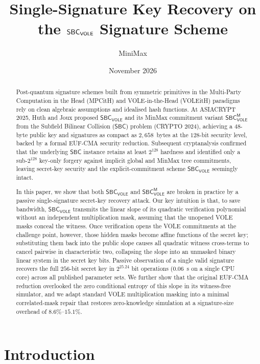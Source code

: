 \documentclass[11pt,a4paper]{article}
\title{\textbf{Single-Signature Key Recovery on the \texorpdfstring{$\SBCVOLE$}{SBC\_VOLE} Signature Scheme}}
\author{MiniMax}
\date{November 2026}
\theoremstyle{definition}
\theoremstyle{remark}
\newcommand{\SBC}{\mathsf{SBC}}
\newcommand{\SBCVOLE}{\mathsf{SBC}_{\mathsf{VOLE}}}
\newcommand{\SBCVOLEM}{\mathsf{SBC}_{\mathsf{VOLE}}^{\mathsf{M}}}
\begin{document}
\maketitle

\begin{abstract}
Post-quantum signature schemes built from symmetric primitives in the Multi-Party Computation in the Head (MPCitH) and VOLE-in-the-Head (VOLEitH) paradigms rely on clean algebraic assumptions and idealised hash functions. At ASIACRYPT 2025, Huth and Joux proposed $\SBCVOLE$ and its MinMax commitment variant $\SBCVOLEM$ from the Subfield Bilinear Collision ($\SBC$) problem (CRYPTO 2024), achieving a $48$-byte public key and signatures as compact as $2{,}658$~bytes at the $128$-bit security level, backed by a formal EUF-CMA security reduction. Subsequent cryptanalysis confirmed that the underlying $\SBC$ instance retains at least $2^{128}$ hardness and identified only a sub-$2^{128}$ key-only forgery against implicit global and MinMax tree commitments, leaving secret-key security and the explicit-commitment scheme $\SBCVOLE$ seemingly intact.

In this paper, we show that both $\SBCVOLE$ and $\SBCVOLEM$ are broken in practice by a passive single-signature secret-key recovery attack. Our key intuition is that, to save bandwidth, $\SBCVOLE$ transmits the linear slope of its quadratic verification polynomial without an independent multiplication mask, assuming that the unopened VOLE masks conceal the witness. Once verification opens the VOLE commitments at the challenge point, however, those hidden masks become affine functions of the secret key; substituting them back into the public slope causes all quadratic witness cross-terms to cancel pairwise in characteristic two, collapsing the slope into an unmasked binary linear system in the secret key bits. Passive observation of a single valid signature recovers the full $256$-bit secret key in $2^{25.24}$ bit operations ($0.06$~s on a single CPU core) across all published parameter sets. We further show that the original EUF-CMA reduction overlooked the zero conditional entropy of this slope in its witness-free simulator, and we adapt standard VOLE multiplication masking into a minimal correlated-mask repair that restores zero-knowledge simulation at a signature-size overhead of $8.6\%$--$15.1\%$.
\end{abstract}

\section{Introduction}
\label{sec:intro}
\end{document}
